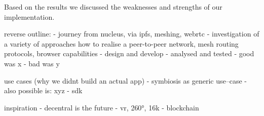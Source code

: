 Based on the results we discussed the weaknesses and strengths of our implementation.

reverse outline:
    - journey from nucleus, via ipfs, meshing, webrtc
    - investigation of a variety of approaches how to realise a peer-to-peer network, mesh routing protocols, browser capabilities
    - design and develop
    - analysed and tested
    - good was x
    - bad was y

use cases (why we didnt build an actual app)
- symbiosis as generic use–case
- also possible is: xyz
- sdk

inspiration
- decentral is the future
- vr, 260°, 16k
- blockchain
